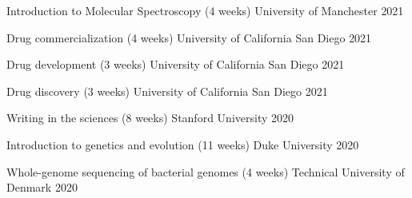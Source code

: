 
\begin{cvhonors}

\cvhonor
{Introduction to Molecular Spectroscopy (4 weeks)}
{University of Manchester}
{2021}

\cvhonor
{Drug commercialization (4 weeks)}
{University of California San Diego}
{2021}

\cvhonor
{Drug development (3 weeks)}
{University of California San Diego}
{2021}
%

\cvhonor
{Drug discovery (3 weeks)}
{University of California San Diego}
{2021}


\cvhonor
{Writing in the sciences (8 weeks)}
{Stanford University}
{2020}

\cvhonor
{Introduction to genetics and evolution (11 weeks)}
{Duke University}
{2020}

\cvhonor
{Whole-genome sequencing of bacterial genomes (4 weeks)}
{Technical University of Denmark}
{2020}

%
%


\end{cvhonors}
